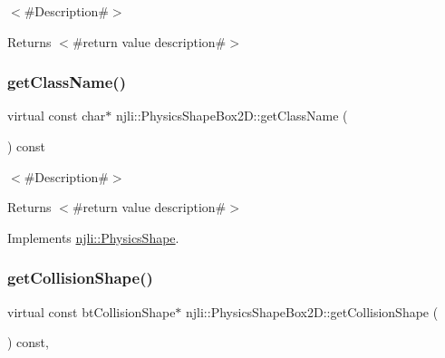 $<$\#\+Description\#$>$

\begin{DoxyReturn}{Returns}
$<$\#return value description\#$>$ 
\end{DoxyReturn}
\mbox{\label{classnjli_1_1_physics_shape_box2_d_a176b8cfb4df192e48295adc6e97a1e8d}} 
\subsubsection{\texorpdfstring{get\+Class\+Name()}{getClassName()}}
{\footnotesize\ttfamily virtual const char$\ast$ njli\+::\+Physics\+Shape\+Box2\+D\+::get\+Class\+Name (\begin{DoxyParamCaption}{ }\end{DoxyParamCaption}) const\hspace{0.3cm}{\ttfamily [virtual]}}

$<$\#\+Description\#$>$

\begin{DoxyReturn}{Returns}
$<$\#return value description\#$>$ 
\end{DoxyReturn}


Implements \mbox{\hyperlink{classnjli_1_1_physics_shape_a72cb98a55614a3e264b8e4a157b45c64}{njli\+::\+Physics\+Shape}}.

\mbox{\label{classnjli_1_1_physics_shape_box2_d_ad8d9342f3ef94ae2426cec1c771c0208}} 
\subsubsection{\texorpdfstring{get\+Collision\+Shape()}{getCollisionShape()}\hspace{0.1cm}{\footnotesize\ttfamily [1/2]}}
{\footnotesize\ttfamily virtual const bt\+Collision\+Shape$\ast$ njli\+::\+Physics\+Shape\+Box2\+D\+::get\+Collision\+Shape (\begin{DoxyParamCaption}{ }\end{DoxyParamCaption}) const\hspace{0.3cm}{\ttfamily [protected]}, {\ttfamily [virtual]}}




